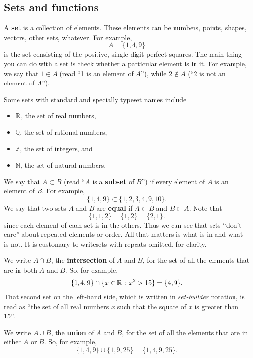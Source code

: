 \documentclass{watsonbook}
\begin{document}
\subsection{Sets and functions}  \label{a:setsandfunctions}

A \textbf{set} is a collection of elements. These elements can be
numbers, points, shapes, vectors, other sets, whatever. For example,
\[
  A = \{1,4,9\} 
\]
is the set consisting of the positive, single-digit perfect
squares. The main thing you can do with a set is check whether a
particular element is in it. For example, we say that $1 \in A$ (read
``1 is an element of $A$''), while $2 \notin A$ (``2 is not an element
of $A$'').

Some sets with standard and specially typeset names include 
\begin{itemize} 
\item $\mathbb{R}$, the set of real numbers, 
\item $\mathbb{Q}$, the set of rational numbers, 
\item $\mathbb{Z}$, the set of integers, and 
\item $\mathbb{N}$, the set of natural numbers. 
\end{itemize}

\begin{tcolorbox}[title = Subsets and set equality, parbox = false,
  colframe = MidnightBlue, colback=softblue]
  We say that $A \subset B$ (read ``$A$ is a \textbf{subset} of $B$'')
  if every element of $A$ is an element of $B$. For example,
  \[
    \{1,4,9\} \subset \{1,2,3,4,9,10\}. 
  \]
  We say that two sets $A$ and $B$ are \textbf{equal} if $A\subset B$ and $B\subset A$. Note that 
  \[
    \{1,1,2\} = \{1,2\} = \{2,1\} . 
  \]
  since each element of each set is in the others. Thus we can see that
  sets ``don't care'' about repeated elements or order. All that
matters is what is in and what is not. It is customary to writesets with
  repeats omitted, for clarity.
\end{tcolorbox} \enlargethispage{1cm} 

\begin{tcolorbox}[title = Intersections and unions, parbox = false,
  colframe = MidnightBlue, colback=softblue] 
  We write $A\cap B$, the \textbf{intersection} of $A$ and $B$, for
  the set of all the elements that are in both $A$ and $B$. So, for
  example,
  \[
    \{1,4,9\} \cap \{ x \in \mathbb{R} \,: x^2 > 15 \} = \{4,9\}. 
  \]
  That second set on the left-hand side, which is written in
  \textit{set-builder} notation, is read as ``the set of all real
  numbers $x$ such that the square of $x$ is greater than 15''.

  We write $A\cup B$, the \textbf{union} of $A$ and $B$, for the set
  of all the elements that are in either $A$ or $B$. So, for example,
  \[
    \{1,4,9\} \cup \{1,9,25\} = \{1,4,9,25\}. 
  \]
\end{tcolorbox}
\end{document}

